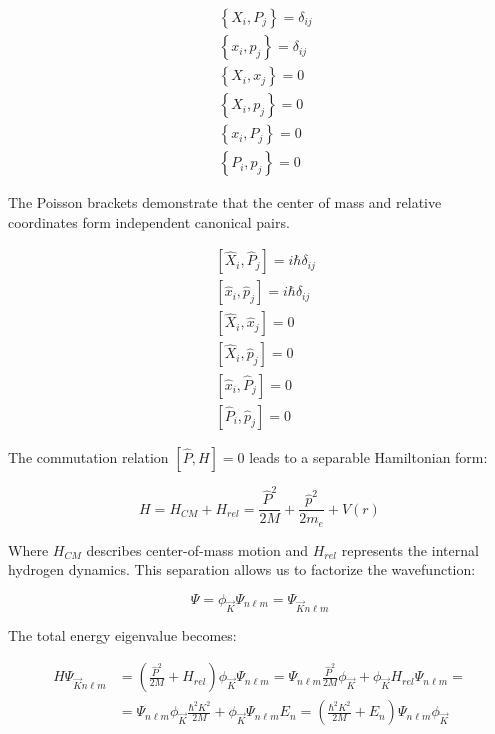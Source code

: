 \documentclass[italian]{HKNdocument}
\begin{document}
\begin{align}
& \left\{X_{i}, P_{j}\right\}=\delta_{i j} \\
& \left\{x_{i}, p_{j}\right\}=\delta_{i j} \\
& \left\{X_{i}, x_{j}\right\}=0 \\
& \left\{X_{i}, p_{j}\right\}=0  \\
& \left\{x_{i}, P_{j}\right\}=0 \\
& \left\{P_{i}, p_{j}\right\}=0
\end{align}

The Poisson brackets demonstrate that the center of mass and relative coordinates form independent canonical pairs.

\begin{align}
& {\left[\hat{X}_{i}, \hat{P}_{j}\right]=i \hbar \delta_{i j}} \\
& {\left[\hat{x}_{i}, \hat{p}_{j}\right]=i \hbar \delta_{i j}} \\
& {\left[\hat{X}_{i}, \hat{x}_{j}\right]=0} \\
& {\left[\hat{X}_{i}, \hat{p}_{j}\right]=0}  \\
& {\left[\hat{x}_{i}, \hat{P}_{j}\right]=0} \\
& {\left[\hat{P}_{i}, \hat{p}_{j}\right]=0}
\end{align}

The commutation relation $[\hat{P}, H]=0$ leads to a separable Hamiltonian form:

\begin{equation}
H=H_{CM}+H_{rel}=\frac{\hat{P}^{2}}{2 M}+\frac{\hat{p}^{2}}{2 m_{e}}+V(r)
\end{equation}

Where $H_{CM}$ describes center-of-mass motion and $H_{rel}$ represents the internal hydrogen dynamics. This separation allows us to factorize the wavefunction:

\begin{equation}
\Psi=\phi_{\vec{K}} \Psi_{n \ell m}=\Psi_{\vec{K} n \ell m}
\end{equation}

The total energy eigenvalue becomes:

\begin{align}
H \Psi_{\vec{K} n \ell m} & =\left(\frac{\hat{P}^{2}}{2 M}+H_{rel}\right) \phi_{\vec{K}} \Psi_{n \ell m}=\Psi_{n \ell m} \frac{\hat{P}^{2}}{2 M} \phi_{\vec{K}}+\phi_{\vec{K}} H_{rel} \Psi_{n \ell m}=  \\
& =\Psi_{n \ell m} \phi_{\vec{K}} \frac{\hbar^{2} K^{2}}{2 M}+\phi_{\vec{K}} \Psi_{n \ell m} E_{n}=\left(\frac{\hbar^{2} K^{2}}{2 M}+E_{n}\right) \Psi_{n \ell m} \phi_{\vec{K}}
\end{align}
\end{document}
